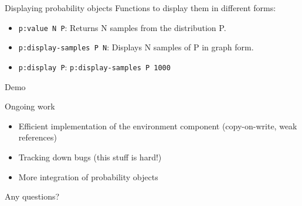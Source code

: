 \documentclass[14pt]{beamer}
\begin{document}
\begin{frame}{Displaying probability objects}
  Functions to display them in different forms:\\
  \begin{itemize}
    \item \texttt{p:value N P}: Returns N samples from the distribution P.
    \item \texttt{p:display-samples P N}: Displays N samples of P in graph form.
    \item \texttt{p:display P}: \texttt{p:display-samples P 1000}
  \end{itemize}
\end{frame}

\begin{frame}{Demo}
  
\end{frame}

\begin{frame}{Ongoing work}
  \begin{itemize}
  \item Efficient implementation of the environment component
    (copy-on-write, weak references) 
  \item Tracking down bugs (this stuff is hard!)
  \item More integration of probability objects
  \end{itemize}
  \vfill
  Any questions?
\end{frame}
\end{document}
